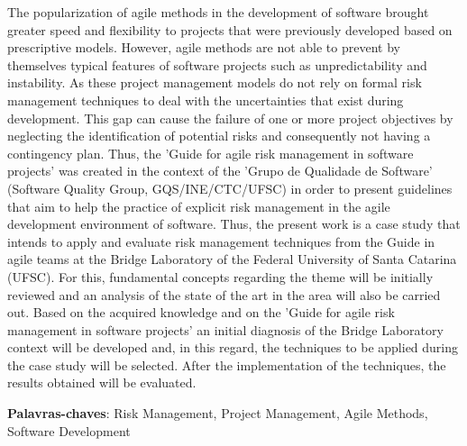 \documentclass[
    12pt,       %
    openright,      %
    twoside,      %
    a4paper,      %
    english,      %
    french,       %
    spanish,      %
    brazil,       %
    ]{abntex2}
\begin{document}
  \begin{resumo}[Abstract]

The popularization of agile methods in the development of software brought greater speed and flexibility to projects that were previously developed based on prescriptive models. However, agile methods are not able to prevent by themselves typical features of software projects such as unpredictability and instability. As these project management models do not rely on formal risk management techniques to deal with the uncertainties that exist during development. This gap can cause the failure of one or more project objectives by neglecting the identification of potential risks and consequently not having a contingency plan. Thus, the 'Guide for agile risk management in software projects' was created in the context of the 'Grupo de Qualidade de Software' (Software Quality Group, GQS/INE/CTC/UFSC) in order to present guidelines that aim to help the practice of explicit risk management in the agile development environment of software. Thus, the present work is a case study that intends to apply and evaluate risk management techniques from the Guide in agile teams at the Bridge Laboratory of the Federal University of Santa Catarina (UFSC). For this, fundamental concepts regarding the theme will be initially reviewed and an analysis of the state of the art in the area will also be carried out. Based on the acquired knowledge and on the 'Guide for agile risk management in software projects' an initial diagnosis of the Bridge Laboratory context will be developed and, in this regard, the techniques to be applied during the case study will be selected. After the implementation of the techniques, the results obtained will be evaluated.

\vspace{\onelineskip}

   \noindent
   \textbf{Palavras-chaves}: Risk Management, Project Management, Agile Methods, Software Development
  \end{resumo}

  \listoffigures*
  \cleardoublepage

  \listoftables*
  \cleardoublepage
\end{document}
